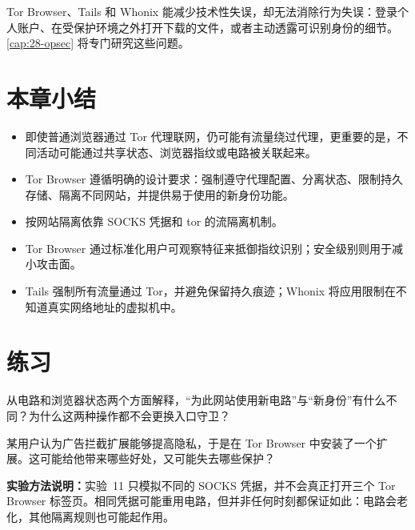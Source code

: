 \begin{attenzione}[工具不能取代良好的使用习惯]
Tor Browser、Tails 和 Whonix 能减少技术性失误，却无法消除行为失误：登录个人账户、在受保护环境之外打开下载的文件，或者主动透露可识别身份的细节。\cref{cap:28-opsec} 将专门研究这些问题。
\end{attenzione}

\section*{本章小结}
\begin{itemize}
  \item 即使普通浏览器通过 Tor 代理联网，仍可能有流量绕过代理，更重要的是，不同活动可能通过共享状态、浏览器指纹或电路被关联起来。
  \item Tor Browser 遵循明确的设计要求：强制遵守代理配置、分离状态、限制持久存储、隔离不同网站，并提供易于使用的新身份功能。
  \item 按网站隔离依靠 SOCKS 凭据和 tor 的流隔离机制。
  \item Tor Browser 通过标准化用户可观察特征来抵御指纹识别；安全级别则用于减小攻击面。
  \item Tails 强制所有流量通过 Tor，并避免保留持久痕迹；Whonix 将应用限制在不知道真实网络地址的虚拟机中。
\end{itemize}

\section*{练习}

\begin{esercizio}[1]\label{es:23-identita}
从电路和浏览器状态两个方面解释，\enquote{为此网站使用新电路}与\enquote{新身份}有什么不同？为什么这两种操作都不会更换入口守卫？
\end{esercizio}

\begin{esercizio}[1]\label{es:23-estensioni}
某用户认为广告拦截扩展能够提高隐私，于是在 Tor Browser 中安装了一个扩展。这可能给他带来哪些好处，又可能失去哪些保护？
\end{esercizio}

\textbf{实验方法说明：}实验~11 只模拟不同的 SOCKS 凭据，并不会真正打开三个 Tor Browser 标签页。相同凭据可能重用电路，但并非任何时刻都保证如此：电路会老化，其他隔离规则也可能起作用。

